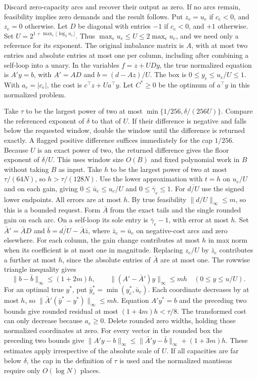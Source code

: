 \documentclass[11pt]{article}
\begin{document}
Discard zero-capacity arcs and recover their output as zero. If no arcs remain, feasibility implies zero demands and the result follows. Put \(z_e=u_e\) if \(c_e<0\), and \(z_e=0\) otherwise. Let \(D\) be diagonal with entries \(-1\) if \(c_e<0\), and \(+1\) otherwise. Set \(U=2^{1+\max_e\lfloor\log_2 u_e\rfloor}\). Thus \(\max_e u_e\le U\le 2\max_e u_e\), and we need only a reference for its exponent. The original imbalance matrix is \(A\), with at most two entries and absolute entries at most one per column, including after combining a self-loop into a unary. In the variables \(f=z+UDy\), the true normalized equation is \(A'y=b\), with \(A'=AD\) and \(b=(d-Az)/U\). The box is \(0\le y_e\le u_e/U\le1\). With \(a_e=|c_e|\), the cost is \(c^\top z+Ua^\top y\). Let \(C^*\ge0\) be the optimum of \(a^\top y\) in this normalized problem.

Take \(\tau\) to be the largest power of two at most \(\min\{1/256,\delta/(256U)\}\). Compare the referenced exponent of \(\delta\) to that of \(U\). If their difference is negative and falls below the requested window, double the window until the difference is returned exactly. A flagged positive difference suffices immediately for the cap \(1/256\). Because \(U\) is an exact power of two, the returned difference gives the floor exponent of \(\delta/U\). This uses window size \(O(B)\) and fixed polynomial work in \(B\) without taking \(B\) as input. Take \(h\) to be the largest power of two at most \(\tau/(64N)\), so \(h>\tau/(128N)\). Use the lower approximation with \(t=h\) on \(u_e/U\) and on each gain, giving \(0\le\bar u_e\le u_e/U\) and \(0\le\bar\gamma_e\le1\). For \(\overline{d/U}\) use the signed lower endpoints. All errors are at most \(h\). By true feasibility \(\|d/U\|_\infty\le m\), so this is a bounded request. Form \(\bar A\) from the exact tails and the single rounded gain on each arc. On a self-loop its sole entry is \(\bar\gamma_e-1\), with error at most \(h\). Set \(\bar A'=\bar A D\) and \(\bar b=\overline{d/U}-\bar A\bar z\), where \(\bar z_e=\bar u_e\) on negative-cost arcs and zero elsewhere. For each column, the gain change contributes at most \(h\) in max norm when its coefficient is at most one in magnitude. Replacing \(z_e/U\) by \(\bar z_e\) contributes a further at most \(h\), since the absolute entries of \(\bar A\) are at most one. The rowwise triangle inequality gives
\[
 \|b-\bar b\|_\infty\le(1+2m)h,\qquad
 \|(A'-\bar A')y\|_\infty\le mh \quad (0\le y\le u/U).
\]
For an optimal true \(y^*\), put \(\bar y_e^*=\min(y_e^*,\bar u_e)\). Each coordinate decreases by at most \(h\), so \(\|\bar A'(\bar y^*-y^*)\|_\infty\le mh\). Equation \(A'y^*=b\) and the preceding two bounds give rounded residual at most \((1+4m)h<\tau/8\). The transformed cost can only decrease because \(a_e\ge0\). Delete rounded zero widths, holding those normalized coordinates at zero. For every vector in the rounded box the preceding two bounds give \(\|A'y-b\|_\infty\le\|\bar A'y-\bar b\|_\infty+(1+3m)h\). These estimates apply irrespective of the absolute scale of \(U\). If all capacities are far below \(\delta\), the cap in the definition of \(\tau\) is used and the normalized mantissas require only \(O(\log N)\) places.
\end{document}
